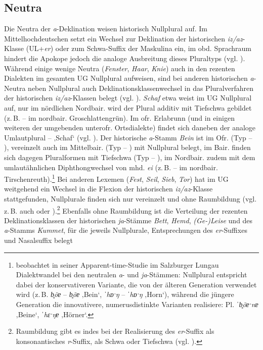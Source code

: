 \subsection{Neutra}\label{sec:8.2.2}
\begin{sloppypar}
Die Neutra der \textit{a}-Deklination weisen historisch Nullplural auf. Im Mittelhochdeutschen setzt ein Wechsel zur Deklination der historischen \textit{iz/az}{}-Klasse (UL+\textit{er}) oder zum Schwa-Suffix der Maskulina ein, im obd. Sprachraum hindert die Apokope jedoch die analoge Ausbreitung dieses Pluraltyps (vgl. ). Während einige wenige Neutra (\textit{Fenster}, \textit{Haar}, \textit{Knie}) auch in den rezenten Dialekten im gesamten UG Nullplural aufweisen, sind bei anderen historischen \textit{a}{}-Neutra neben Nullplural auch Deklinationsklassenwechsel in das Pluralverfahren der historischen \textit{iz/az}{}-Klassen belegt (vgl. \citealt[§798]{Schmeller1821}). \textit{Schaf} etwa weist im UG Nullplural auf, nur im nördlichen Nordbair. wird der Plural additiv mit Tiefschwa gebildet (z.\,B.  --  im nordbair. Groschlattengrün). Im ofr. Erlabrunn (und in einigen weiteren der umgebenden unterofr. Ortsdialekte) findet sich daneben der analoge Umlautplural  --  ‚Schaf‘ (vgl. \citealt[Karte 50]{SBS9.1}). Der his\-to\-ri\-sche \textit{a}{}-Stamm \textit{Bein} ist im Ofr. (Typ  --  ), vereinzelt auch im Mittelbair. (Typ  -- ) mit Nullplural belegt, im Bair. finden sich dagegen Pluralformen mit Tiefschwa (Typ  -- ), im Nordbair. zudem mit dem umlautähnlichen Diphthongwechsel von mhd. \textit{ei} (z.\,B.  --  im nordbair. Tirschenreuth).\footnote{\citet[131]{Mauser2000} beobachtet in seiner Apparent-time-Studie im Salzburger Lungau Dialektwandel bei den neutralen \textit{a}{}- und \textit{ja}{}-Stämmen: Nullplural entspricht dabei der konservativeren Variante, die von der älteren Generation verwendet wird (z.\,B. \textit{b̥õɐ} -- \textit{b̥õɐ} ‚Bein‘, \textit{ˈhɒˑŋ} -- \textit{ˈhɒˑŋ} ‚Horn‘), während die jüngere Generation die innovativere, numerusdistinkte Varianten realisiere: Pl. \textit{ˈb̥õɐˑnɐ} ‚Beine‘, \textit{ˈhɛˑŋɐ} ‚Hörner‘.} Bei anderen Lexemen (\textit{Fest}, \textit{Seil}, \textit{Sieb}, \textit{Tor}) hat im UG weitgehend ein Wechsel in die Flexion der his\-to\-ri\-schen \textit{iz/az}{}-Klasse stattgefunden, Nullplurale finden sich nur vereinzelt und ohne Raumbildung (vgl. z.\,B. auch \citealt[Karte 14]{SMF7} oder \citealt[Karte 101]{SNiB7}).\footnote{Raumbildung gibt es indes bei der Realisierung des \textit{er}{}-Suffix als konsonantisches \textit{r}{}-Suffix, als Schwa oder Tiefschwa (vgl. \citealt[Karte 52]{SBS9.1}).} Ebenfalls ohne Raumbildung ist die Verteilung der rezenten Deklinationsklassen der historischen \textit{ja}-Stämme \textit{Bett}, \textit{Hemd}, \textit{(Ge-)Leise} und des \textit{a}{}-Stamms \textit{Kummet}, für die jeweils Nullplurale, Entsprechungen des \textit{er}{}-Suffixes und Nasalsuffix belegt 
\end{sloppypar}
